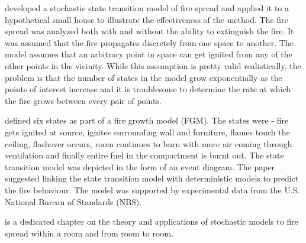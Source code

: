 \documentclass[12pt]{asme2ej}
\begin{document}
\cite{Yasaburo1985} developed a stochastic state transition model of fire spread and applied it to a hypothetical small house to illustrate the effectiveness of the method. 	The fire spread was analyzed both with and without the ability to extinguish the fire. It was assumed that the fire propagates discretely from one space to another. The model assumes that an arbitrary point in space can get ignited from any of the other points in the vicinity. While this assumption is pretty valid realistically, the problem is that the number of states in the model grow exponentially as the points of interest increase and it is troublesome to determine the rate at which the fire grows between every pair of points.


\cite{Williamson1981} defined six states as part of a fire growth model (FGM). The states were -  fire gets ignited at source, ignites surrounding wall and furniture, flames touch the ceiling, flashover occurs, room continues to burn with more air coming through ventilation and finally entire fuel in the compartment is burnt out. The state transition model was depicted in the form of an event diagram. The paper suggested linking the state transition model with deterministic models to predict the fire behaviour. The model was supported by experimental data from the U.S. National Bureau of Standards (NBS).

\cite{Watts2004} is a dedicated chapter on the theory and applications of stochastic models to fire spread within a room and from room to room.
\end{document}
